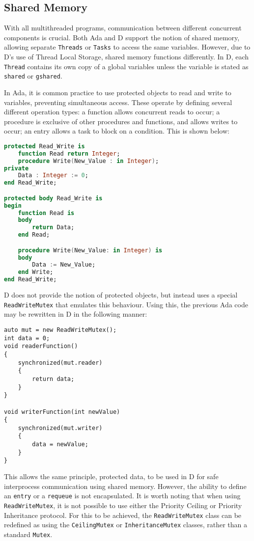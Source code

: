 \subsection{Shared Memory}
With all multithreaded programs, communication between different concurrent
components is crucial. Both Ada and D support the notion of shared memory,
allowing separate \texttt{Threads} or \texttt{Tasks} to access the same
variables. However, due to D's use of Thread Local Storage, shared memory functions
differently. In D, each \texttt{Thread} contains its own copy of a global 
variables unless the variable is stated 
as \texttt{shared} or \texttt{\textunderscore{}\textunderscore{}gshared}. 
\par\bigskip\noindent
In Ada, it is common practice to use protected objects to read and write to
variables, preventing simultaneous access. These operate by defining several different 
operation types: a function allows concurrent reads to occur; a procedure
is exclusive of other procedures and functions, and allows writes to occur; 
an entry allows a task to block on a condition. This is shown
below: 
\begin{lstlisting}[basicstyle=\small,language=Ada]
protected Read_Write is
    function Read return Integer;
    procedure Write(New_Value : in Integer); 
private 
    Data : Integer := 0; 
end Read_Write;

protected body Read_Write is 
begin 
    function Read is 
    body 
        return Data; 
    end Read; 

    procedure Write(New_Value: in Integer) is 
    body
        Data := New_Value; 
    end Write; 
end Read_Write; 
\end{lstlisting}
D does not provide the notion of protected objects, but instead uses a
special \texttt{ReadWriteMutex} that emulates this behaviour.
Using this, the previous Ada code may be rewritten in D
in the following manner: 
\begin{lstlisting}[basicstyle=\small]
auto mut = new ReadWriteMutex(); 
int data = 0; 
void readerFunction()
{
    synchronized(mut.reader)
    {
        return data; 
    }
}

void writerFunction(int newValue)
{
    synchronized(mut.writer)
    {
        data = newValue;
    }
}
\end{lstlisting}
This allows the same principle, protected data, to be used in D for
safe interprocess communication using shared memory. However, the ability to 
define an \texttt{entry} or a \texttt{requeue} is not encapsulated. 
It is worth noting that when using \texttt{ReadWriteMutex}, it is not possible to 
use either the Priority Ceiling or Priority Inheritance protocol.
For this to be achieved, the \texttt{ReadWriteMutex} class
can be redefined as using the \texttt{CeilingMutex} or
\texttt{InheritanceMutex} classes, rather than a standard \texttt{Mutex}. 


